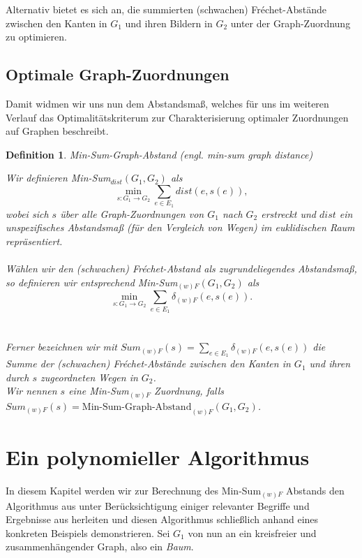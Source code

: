 \documentclass[a4paper, 12pt, twoside]{article}
\theoremstyle{Format1} %
\newtheorem{Def}{Definition}[section]       %
\begin{document}
Alternativ bietet es sich an, die summierten (schwachen) Fréchet-Abstände zwischen den Kanten in $G_1$ und ihren Bildern in $G_2$ unter der Graph-Zuordnung zu optimieren.

\subsection{Optimale Graph-Zuordnungen} \label{Optimale Graphzuordnungen}
Damit widmen wir uns nun dem Abstandsmaß, welches für uns im weiteren Verlauf das Optimalitätskriterum zur Charakterisierung optimaler Zuordnungen auf Graphen beschreibt.

\begin{Def} \label{Definition Min-Sum}
	Min-Sum-Graph-Abstand (engl. min-sum graph distance)

	Wir definieren \textit{Min-Sum}$_{dist}(G_1, G_2)$ als
	$$\min_{s: G_1 \to G_2} \sum_{e \in E_1} dist(e, s(e)),$$
	wobei sich $s$ über alle Graph-Zuordnungen von $G_1$ nach $G_2$ erstreckt und $dist$ ein unspezifisches Abstandsmaß (für den Vergleich von Wegen)
	im euklidischen Raum repräsentiert.
	\\
	\\
	Wählen wir den (schwachen) Fréchet-Abstand als zugrundeliegendes Abstandsmaß, so definieren wir entsprechend
	\textit{Min-Sum}$_{(w)F}(G_1, G_2)$ als $$\min_{s: G_1 \to G_2} \sum_{e \in E_1} \delta_{(w)F}(e, s(e)).$$
	\\
	\\
	Ferner bezeichnen wir mit $Sum_{(w)F}(s) = \sum_{e \in E_1}\delta_{(w)F}(e, s(e))$ die Summe der (schwachen) Fréchet-Abstände zwischen den Kanten
	in $G_1$ und ihren durch $s$ zugeordneten Wegen in $G_2$.
	\\
	Wir nennen $s$ eine Min-Sum$_{(w)F}$ Zuordnung, falls
	\\
	$Sum_{(w)F}(s) = \text{Min-Sum-Graph-Abstand}_{(w)F}(G_1,G_2)$.

\end{Def}

\newpage
\section{Ein polynomieller Algorithmus} \label{Kapitel 3}

In diesem Kapitel werden wir zur Berechnung des Min-Sum$_{(w)F}$ Abstands den Algorithmus aus \cite{Buchin} unter Berücksichtigung einiger relevanter
Begriffe und Ergebnisse aus \cite{Akitaya} herleiten und diesen Algorithmus schließlich anhand eines konkreten Beispiels demonstrieren.
Sei $G_1$ von nun an ein kreisfreier und zusammenhängender Graph, also ein \textit{Baum}.
\end{document}
